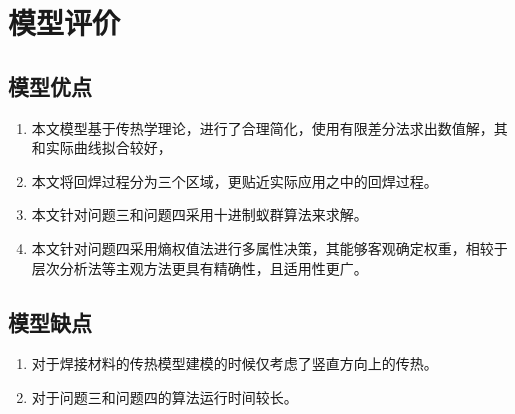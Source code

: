 \section{模型评价}
\subsection{模型优点}
\begin{enumerate}
\item 本文模型基于传热学理论，进行了合理简化，使用有限差分法求出数值解，其和实际曲线拟合较好，
\item 本文将回焊过程分为三个区域，更贴近实际应用之中的回焊过程。
\item 本文针对问题三和问题四采用十进制蚁群算法来求解。
\item 本文针对问题四采用熵权值法进行多属性决策，其能够客观确定权重，相较于层次分析法等主观方法更具有精确性，且适用性更广。
\end{enumerate}

\subsection{模型缺点}
\begin{enumerate}
\item 对于焊接材料的传热模型建模的时候仅考虑了竖直方向上的传热。
\item 对于问题三和问题四的算法运行时间较长。
\end{enumerate}
